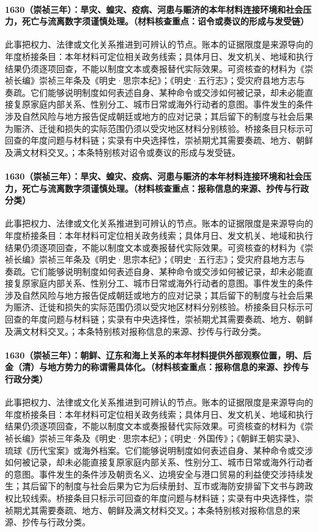 \paragraph{1630（崇祯三年）：旱灾、蝗灾、疫病、河患与赈济的本年材料连接环境和社会压力，死亡与流离数字须谨慎处理。（材料核查重点：诏令或奏议的形成与发受链）} 此事把权力、法律或文化关系推进到可辨认的节点。账本的证据限度是来源导向的年度桥接条目：本年材料可定位相关政务线索；具体月日、发文机关、地域和执行结果仍须逐项回查，不能以制度文本或奏报替代实际效果。可资核查的材料为《崇祯长编》崇祯三年条及《明史·思宗本纪》；《明史·五行志》；受灾府县地方志与奏疏。它们能够说明制度如何表述自身、某种命令或交涉如何被记录，却未必能直接复原家庭内部关系、性别分工、城市日常或海外行动者的意图。事件发生的条件涉及自然风险与地方报告促成朝廷或地方的应对记录；其后留下的制度与社会后果为赈济、迁徙和损失的实际范围仍须以受灾地区材料分别核验。桥接条目只标示可回查的年度问题与材料链；实录有中央选择性，崇祯期尤其需要奏疏、地方、朝鲜及满文材料交叉。；本条特别核对诏令或奏议的形成与发受链。

\paragraph{1630（崇祯三年）：旱灾、蝗灾、疫病、河患与赈济的本年材料连接环境和社会压力，死亡与流离数字须谨慎处理。（材料核查重点：报称信息的来源、抄传与行政分类）} 此事把权力、法律或文化关系推进到可辨认的节点。账本的证据限度是来源导向的年度桥接条目：本年材料可定位相关政务线索；具体月日、发文机关、地域和执行结果仍须逐项回查，不能以制度文本或奏报替代实际效果。可资核查的材料为《崇祯长编》崇祯三年条及《明史·思宗本纪》；《明史·五行志》；受灾府县地方志与奏疏。它们能够说明制度如何表述自身、某种命令或交涉如何被记录，却未必能直接复原家庭内部关系、性别分工、城市日常或海外行动者的意图。事件发生的条件涉及自然风险与地方报告促成朝廷或地方的应对记录；其后留下的制度与社会后果为赈济、迁徙和损失的实际范围仍须以受灾地区材料分别核验。桥接条目只标示可回查的年度问题与材料链；实录有中央选择性，崇祯期尤其需要奏疏、地方、朝鲜及满文材料交叉。；本条特别核对报称信息的来源、抄传与行政分类。

\paragraph{1630（崇祯三年）：朝鲜、辽东和海上关系的本年材料提供外部观察位置，明、后金（清）与地方势力的称谓需具体化。（材料核查重点：报称信息的来源、抄传与行政分类）} 此事把权力、法律或文化关系推进到可辨认的节点。账本的证据限度是来源导向的年度桥接条目：本年材料可定位相关政务线索；具体月日、发文机关、地域和执行结果仍须逐项回查，不能以制度文本或奏报替代实际效果。可资核查的材料为《崇祯长编》崇祯三年条及《明史·思宗本纪》；《明史·外国传》；《朝鲜王朝实录》、琉球《历代宝案》或海外档案。它们能够说明制度如何表述自身、某种命令或交涉如何被记录，却未必能直接复原家庭内部关系、性别分工、城市日常或海外行动者的意图。事件发生的条件涉及朝贡名义、边境安全与港口贸易的利益使交涉持续发生；其后留下的制度与社会后果为它为后续册封、互市或海防安排留下文书与跨政权比较线索。桥接条目只标示可回查的年度问题与材料链；实录有中央选择性，崇祯期尤其需要奏疏、地方、朝鲜及满文材料交叉。；本条特别核对报称信息的来源、抄传与行政分类。

